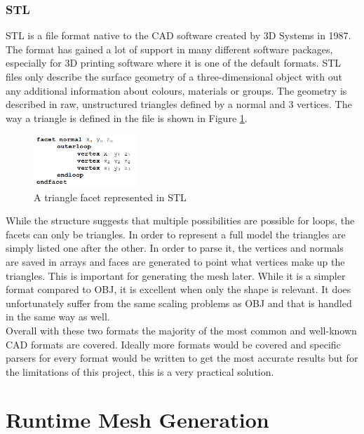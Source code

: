 \subsubsection{STL}
STL is a file format native to the CAD software created by 3D Systems in 1987\cite{}. The format has gained a lot of support in many different software packages, especially for 3D printing software where it is one of the default formats. STL files only describe the surface geometry of a three-dimensional object with out any additional information about colours, materials or groups. The geometry is described in raw, unstructured triangles defined by a normal and 3 vertices. The way a triangle is defined in the file is shown in Figure \ref{fig:STLFormat}. 
\begin{figure}[htpb]
	\centering
	\includegraphics[width=0.35\textwidth]{fig/STLFormat.png}
	\caption[STL Triangle facet]{A triangle facet represented in STL\protect}
	\label{fig:STLFormat}
\end{figure}

While the structure suggests that multiple possibilities are possible for loops, the facets can only be triangles. In order to represent a full model the triangles are simply listed one after the other. In order to parse it, the vertices and normals are saved in arrays and faces are generated to point what vertices make up the triangles. This is important for generating the mesh later. While it is a simpler format compared to OBJ, it is excellent when only the shape is relevant. It does unfortunately suffer from the same scaling problems as OBJ and that is handled in the same way as well.\\
Overall with these two formats the majority of the most common and well-known CAD formats are covered. Ideally more formats would be covered and specific parsers for every format would be written to get the most accurate results but for the limitations of this project, this is a very practical solution.

\section{Runtime Mesh Generation}

